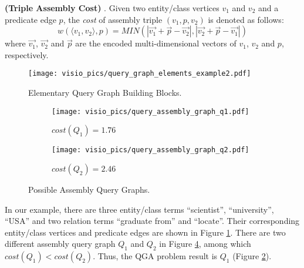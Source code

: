 \begin{definition}\textbf{ (Triple Assembly Cost) }. \label{def:tripleassemblycost}
	Given two entity/class vertices $v_1$ and $v_2$ and a predicate edge $p$, the \emph{cost} of assembly triple $(v_1,p,v_2)$ is denoted as follows:
	\begin{equation}\label{equ:tripleassembly}
	w(\langle v_1, v_2\rangle, p) = MIN(| \overrightarrow{v_1} + \overrightarrow p  - \overrightarrow {v_2 } |, | \overrightarrow{v_2} + \overrightarrow p  - \overrightarrow {v_1 } |)
	\end{equation}
	where $\overrightarrow{v_1}$, $\overrightarrow {v_2}$ and $\overrightarrow {p}$ are the encoded multi-dimensional vectors  of $v_1$, $v_2$ and $p$, respectively. 
\end{definition}  

\begin{figure} [h]
	\centering
	\scalebox{1.0}
	{
		\resizebox{\linewidth}{!}
		{
			\texttt{[image: visio\_pics/query\_graph\_elements\_example2.pdf]}
		}
	}
	\caption{Elementary Query Graph Building Blocks.}
	\label{fig:graph_elements_exp2}
	\vspace{-0.3in}
\end{figure}

\begin{figure} [h]
	\newcommand{\mywidth}{0.23\textwidth}
	\centering
	\begin{subfigure}[t]{\mywidth}
		\centering
		\resizebox{\linewidth}{!}
		{
			\texttt{[image: visio\_pics/query\_assembly\_graph\_q1.pdf]}
			
		}
		\caption{$cost(Q_1)=1.76$}
		\label{fig:assembly_query_graph_q1}
	\end{subfigure}
	\begin{subfigure}[t]{\mywidth}
		\centering
		\resizebox{1.0\linewidth}{!}
		{
			\texttt{[image: visio\_pics/query\_assembly\_graph\_q2.pdf]}
		}
		\caption[font=\small]{$cost(Q_2)=2.46$}
		\label{fig:assembly_query_graph_q2}
	\end{subfigure}
	\caption{Possible Assembly Query Graphs.}
	\label{fig:assembly_query_graph}
	\vspace{-0.1in}
\end{figure}

\begin{example} In our example, there are three entity/class terms ``scientist'', ``university'', ``USA'' and two relation terms ``graduate from''  and ``locate''. Their corresponding entity/class vertices and predicate edges are shown in Figure \ref{fig:graph_elements_exp2}. There are two different assembly query graph $Q_1$ and $Q_2$ in Figure \ref{fig:assembly_query_graph}, among which $cost(Q_1)<cost(Q_2)$. Thus, the QGA problem result is $Q_1$ (Figure \ref{fig:assembly_query_graph_q1}).
\end{example}